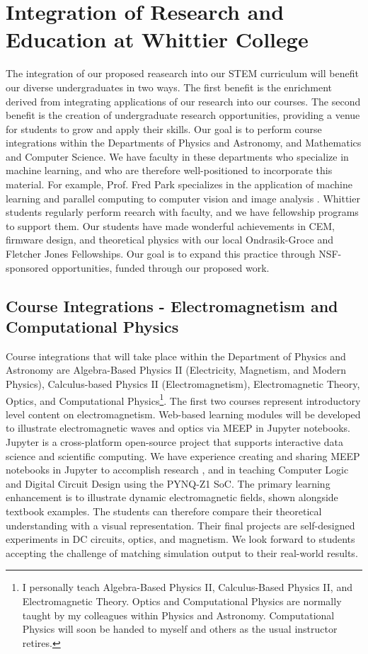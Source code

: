 \documentclass[10pt]{amsart}
\theoremstyle{definition}
\numberwithin{equation}{section}
\begin{document}
\section{Integration of Research and Education at Whittier College}
\label{sec:int}

The integration of our proposed reasearch into our STEM curriculum will benefit our diverse undergraduates in two ways.  The first benefit is the enrichment derived from integrating applications of our research into our courses.  The second benefit is the creation of undergraduate research opportunities, providing a venue for students to grow and apply their skills.  Our goal is to perform course integrations within the Departments of Physics and Astronomy, and Mathematics and Computer Science.  We have faculty in these departments who specialize in machine learning, and who are therefore well-positioned to incorporate this material.  For example, Prof. Fred Park specializes in the application of machine learning and parallel computing to computer vision and image analysis \cite{SHI201528,doi:10.1137/20M1337041}.  Whittier students regularly perform reearch with faculty, and we have fellowship programs to support them.  Our students have made wonderful achievements in CEM, firmware design, and theoretical physics with our local Ondrasik-Groce and Fletcher Jones Fellowships.  Our goal is to expand this practice through NSF-sponsored opportunities, funded through our proposed work.

\subsection{Course Integrations - Electromagnetism and Computational Physics}
\label{sec:integration}

Course integrations that will take place within the Department of Physics and Astronomy are Algebra-Based Physics II (Electricity, Magnetism, and Modern Physics), Calculus-based Physics II (Electromagnetism), Electromagnetic Theory, Optics, and Computational Physics\footnote{I personally teach Algebra-Based Physics II, Calculus-Based Physics II, and Electromagnetic Theory.  Optics and Computational Physics are normally taught by my colleagues within Physics and Astronomy.  Computational Physics will soon be handed to myself and others as the usual instructor retires.}.  The first two courses represent introductory level content on electromagnetism.  Web-based learning modules will be developed to illustrate electromagnetic waves and optics via MEEP in Jupyter notebooks.  Jupyter is a cross-platform open-source project that supports interactive data science and scientific computing.  We have experience creating and sharing MEEP notebooks in Jupyter to accomplish research \cite{electronics10040415}, and in teaching Computer Logic and Digital Circuit Design using the PYNQ-Z1 SoC. The primary learning enhancement is to illustrate dynamic electromagnetic fields, shown alongside textbook examples.  The students can therefore compare their theoretical understanding with a visual representation.  Their final projects are self-designed experiments in DC circuits, optics, and magnetism.  We look forward to students accepting the challenge of matching simulation output to their real-world results. 
\end{document}

